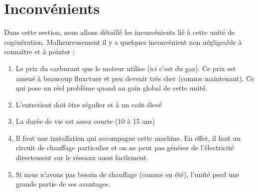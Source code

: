 \section{Inconvénients}
\label{sec:inconvenients}
Dans cette section, nous allons détaillé les inconvénients lié à cette unité de cogénération.
Malheureusement il y a quelques inconvénient non négligeable à connaître et à pointer :
\begin{enumerate}
  \item Le prix du carburant que le moteur utilise (ici c'est du gaz). Ce prix est amené à beaucoup fluxctuer et peu devenir très cher (comme maintenant). Ce qui pose un réel problème quand au gain global de cette unité.
  \item L'entretient doit être régulier et à un coût élevé
  \item La durée de vie est assez courte (10  à 15 ans)
  \item Il faut une installation qui accompagne cette machine. En effet, il faut un circuit de chauffage particulier et on ne peut pas générer de l'électricité directement sur le réseaux aussi facilement.
  \item Si nous n'avons pas besoin de chauffage (comme en été), l'unité perd une grande partie de ses avantages.
\end{enumerate}
